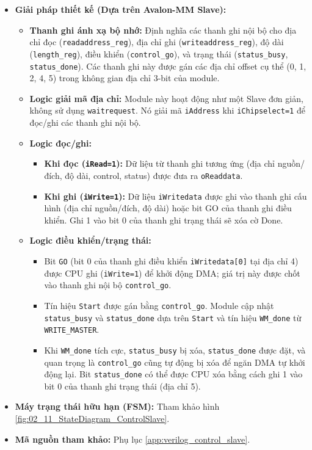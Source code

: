 \begin{itemize}
    \item \textbf{Giải pháp thiết kế (Dựa trên Avalon-MM Slave):}
        \begin{itemize}
            \item \textbf{Thanh ghi ánh xạ bộ nhớ:} Định nghĩa các thanh ghi nội bộ cho địa chỉ đọc (\texttt{readaddress\_reg}), địa chỉ ghi (\texttt{writeaddress\_reg}), độ dài (\texttt{length\_reg}), điều khiển (\texttt{control\_go}), và trạng thái (\texttt{status\_busy}, \texttt{status\_done}). Các thanh ghi này được gán các địa chỉ offset cụ thể (0, 1, 2, 4, 5) trong không gian địa chỉ 3-bit của module.
            \item \textbf{Logic giải mã địa chỉ:} Module này hoạt động như một Slave đơn giản, không sử dụng \texttt{waitrequest}. Nó giải mã \texttt{iAddress} khi \texttt{iChipselect=1} để đọc/ghi các thanh ghi nội bộ.
            \item \textbf{Logic đọc/ghi:} 
            \begin{itemize}
                \item \textbf{Khi đọc (\texttt{iRead=1}):} Dữ liệu từ thanh ghi tương ứng (địa chỉ nguồn/đích, độ dài, control, status) được đưa ra \texttt{oReaddata}.
                \item \textbf{Khi ghi (\texttt{iWrite=1}):} Dữ liệu \texttt{iWritedata} được ghi vào thanh ghi cấu hình (địa chỉ nguồn/đích, độ dài) hoặc bit GO của thanh ghi điều khiển. Ghi 1 vào bit 0 của thanh ghi trạng thái sẽ xóa cờ Done.
            \end{itemize}
            \item \textbf{Logic điều khiển/trạng thái:} 
            \begin{itemize}
                \item Bit \texttt{GO} (bit 0 của thanh ghi điều khiển \texttt{iWritedata[0]} tại địa chỉ 4) được CPU ghi (\texttt{iWrite=1}) để khởi động DMA; giá trị này được chốt vào thanh ghi nội bộ \texttt{control\_go}. 
                \item Tín hiệu \texttt{Start} được gán bằng \texttt{control\_go}. Module cập nhật \texttt{status\_busy} và \texttt{status\_done} dựa trên \texttt{Start} và tín hiệu \texttt{WM\_done} từ \texttt{WRITE\_MASTER}. 
                \item Khi \texttt{WM\_done} tích cực, \texttt{status\_busy} bị xóa, \texttt{status\_done} được đặt, và quan trọng là \texttt{control\_go} cũng tự động bị xóa để ngăn DMA tự khởi động lại. Bit \texttt{status\_done} có thể được CPU xóa bằng cách ghi 1 vào bit 0 của thanh ghi trạng thái (địa chỉ 5).
            \end{itemize}
        \end{itemize}
    \item \textbf{Máy trạng thái hữu hạn (FSM):} Tham khảo hình \ref{fig:02_11_StateDiagram_ControlSlave}.
    \item \textbf{Mã nguồn tham khảo:} Phụ lục \ref{app:verilog_control_slave}.
\end{itemize}

